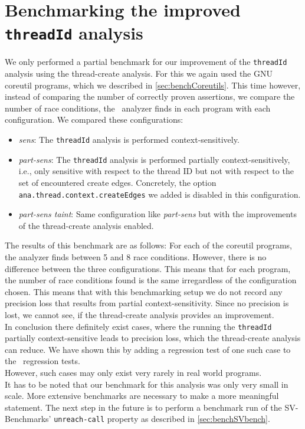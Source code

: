   \section{Benchmarking the improved \texttt{threadId} analysis}
    We only performed a partial benchmark for our improvement of the \texttt{threadId} analysis using the thread-create analysis. For this we again used the GNU coreutil programs, which we described in \autoref{sec:benchCoreutils}. This time however, instead of comparing the number of correctly proven assertions, we compare the number of race conditions, the \gob\ analyzer finds in each program with each configuration. We compared these configurations:
    \begin{itemize}
      \item \textit{sens}: The \texttt{threadId} analysis is performed context-sensitively.
      \item \textit{part-sens}: The \texttt{threadId} analysis is performed partially context-sensitively, i.e., only sensitive with respect to the thread ID but not with respect to the set of encountered create edges. Concretely, the option \texttt{ana.thread.context.createEdges} we added is disabled in this configuration.
      \item \textit{part-sens taint}: Same configuration like \textit{part-sens} but with the improvements of the thread-create analysis enabled.
    \end{itemize}
    The results of this benchmark are as follows: For each of the coreutil programs, the analyzer finds between 5 and 8 race conditions. However, there is no difference between the three configurations. This means that for each program, the number of race conditions found is the same irregardless of the configuration chosen. This means that with this benchmarking setup we do not record any precision loss that results from partial context-sensitivity. Since no precision is lost, we cannot see, if the thread-create analysis provides an improvement.
    \\
    In conclusion there definitely exist cases, where the running the \texttt{threadId} partially context-sensitive leads to precision loss, which the thread-create analysis can reduce. We have shown this by adding a regression test of one such case to the \gob\ regression tests.\\
    However, such cases may only exist very rarely in real world programs.\\
    It has to be noted that our benchmark for this analysis was only very small in scale. More extensive benchmarks are necessary to make a more meaningful statement. The next step in the future is to perform a benchmark run of the SV-Benchmarks' \texttt{unreach-call} property as described in \autoref{sec:benchSVbench}.
